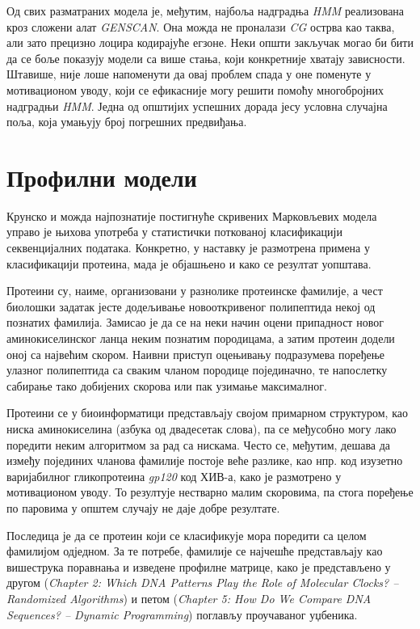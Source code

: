 \documentclass[12pt,oneside]{memoir}
\begin{document}
\begin{CJK}{UTF8}{ipxm}
Од свих разматраних модела је, међутим, најбоља надградња \textit{HMM} реализована кроз сложени алат \textit{GENSCAN}. Она можда не проналази \textit{CG} острва као таква, али зато прецизно лоцира кодирајуће егзоне. Неки општи закључак могао би бити да се боље показују модели са више стања, који конкретније хватају зависности. Штавише, није лоше напоменути да овај проблем спада у оне поменуте у мотивационом уводу, који се ефикасније могу решити помоћу многобројних надградњи \textit{HMM}. Једна од општијих успешних дорада јесу условна случајна поља, која умањују број погрешних предвиђања\cite{culotta2005, decaprio2007}.

\section{Профилни модели}
Крунско и можда најпознатије постигнуће скривених Марковљевих модела управо је њихова употреба у статистички поткованој класификацији секвенцијалних података. Конкретно, у наставку је размотрена примена у класификацији протеина, мада је објашњено и како се резултат уопштава.

Протеини су, наиме, организовани у разнолике протеинске фамилије, а чест биолошки задатак јесте додељивање новооткривеног полипептида некој од познатих фамилија. Замисао је да се на неки начин оцени припадност новог аминокиселинског ланца неким познатим породицама, а затим протеин додели оној са највећим скором. Наивни приступ оцењивању подразумева поређење улазног полипептида са сваким чланом породице појединачно, те напослетку сабирање тако добијених скорова или пак узимање максималног.

Протеини се у биоинформатици представљају својом примарном структуром, као ниска аминокиселина (азбука од двадесетак слова), па се међусобно могу лако поредити неким алгоритмом за рад са нискама. Често се, међутим, дешава да између појединих чланова фамилије постоје веће разлике, као нпр. код изузетно варијабилног гликопротеина \textit{gp120} код ХИВ-а, како је размотрено у мотивационом уводу. То резултује нестварно малим скоровима, па стога поређење по паровима у општем случају не даје добре резултате.

Последица је да се протеин који се класификује мора поредити са целом фамилијом одједном. За те потребе, фамилије се најчешће представљају као вишеструка поравнања и изведене профилне матрице, како је представљено у другом (\textit{Chapter 2: Which DNA Patterns Play the Role of Molecular Clocks? -- Randomized Algorithms}) и петом (\textit{Chapter 5: How Do We Compare DNA Sequences? -- Dynamic Programming}) поглављу проучаваног уџбеника.


\end{CJK}
\end{document}
